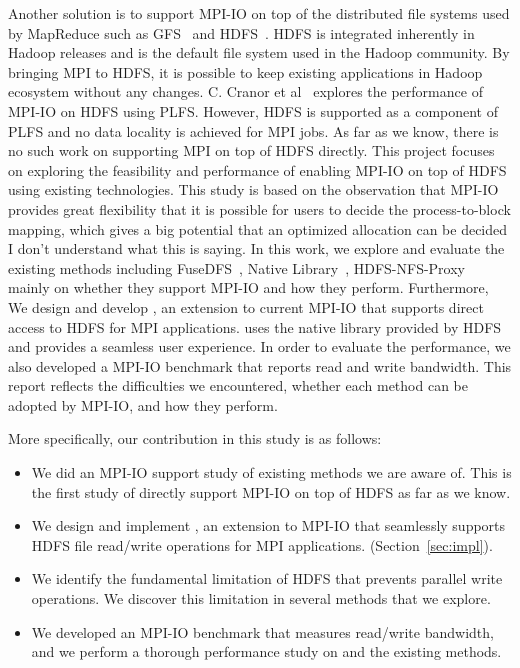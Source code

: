 Another solution is to support MPI-IO on top of the distributed file systems
used by MapReduce such as GFS~\cite{gfs} and HDFS~\cite{hdfs}. HDFS is integrated
inherently in Hadoop releases and is the default file system used in the Hadoop
community. By bringing MPI to HDFS, it is possible to keep existing applications
in Hadoop ecosystem without any changes. C. Cranor et al~\cite{CMU-PDL-12-115} explores the
performance of MPI-IO on HDFS using PLFS. However, HDFS is supported as a
component of PLFS and no data locality is achieved for MPI jobs. As far as we
know, there is no such work on supporting MPI on top of HDFS directly. This
project focuses on exploring the feasibility and performance of enabling MPI-IO
on top of HDFS using existing technologies. This study is based on the
observation that MPI-IO provides great flexibility that it is possible for users
to decide the process-to-block mapping, which gives a big potential that an
optimized allocation can be decided {\color{red} I don't understand what this is saying}. In this work, we explore and evaluate
the existing methods including FuseDFS~\cite{fuse}, Native Library~\cite{lib},
HDFS-NFS-Proxy~\cite{proxy} mainly on whether they support MPI-IO and how
they perform. Furthermore, We design and develop
{\proj}, an extension to current MPI-IO that supports direct access to HDFS for
MPI applications. {\proj} uses the native library provided by HDFS and provides a
seamless user experience. In order to evaluate the performance, we also
developed a MPI-IO benchmark that reports read and write bandwidth. This report
reflects the difficulties we encountered, whether each method can be adopted by
MPI-IO, and how they perform. 

More specifically, our contribution in this study is as follows:
\begin{itemize}
\item We did an MPI-IO support study of existing methods we are aware of. This
	is the first study of directly support MPI-IO on top of HDFS as far as
	we know.
\item We design and implement {\proj}, an extension to MPI-IO that seamlessly
	supports HDFS file read/write operations for MPI applications. 
	(Section~\ref{sec:impl}).
\item We identify the fundamental limitation of HDFS that prevents parallel
	write operations. We discover this limitation in several methods that we
	explore.
\item We developed an MPI-IO benchmark that measures read/write bandwidth, and
	we perform a thorough performance study on {\proj} and the existing methods.
\end{itemize}

